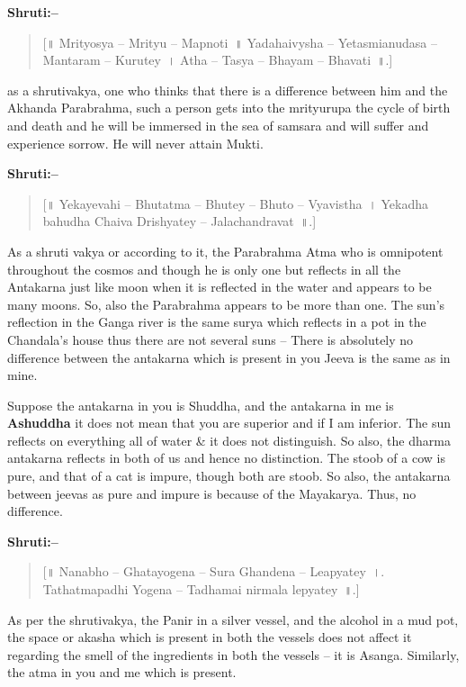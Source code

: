 \textbf{Shruti:–}

\begin{verse}
[॥ Mrityosya – Mrityu – Mapnoti~॥ Yadahaivysha – Yetasmianudasa – Mantaram – Kurutey~। Atha – Tasya – Bhayam – Bhavati~॥.]
\end{verse}

as a shrutivakya, one who thinks that there is a difference between him and the Akhanda Parabrahma, such a person gets into the mrityurupa the cycle of birth and death and he will be immersed in the sea of samsara and will suffer and experience sorrow. He will never attain Mukti.

\textbf{Shruti:–}

\begin{verse}
[॥ Yekayevahi – Bhutatma – Bhutey – Bhuto – Vyavistha~। Yekadha bahudha Chaiva Drishyatey – Jalachandravat~॥.]
\end{verse}

As a shruti vakya or according to it, the Parabrahma Atma who is omnipotent throughout the cosmos and though he is only one but reflects in all the Antakarna just like moon when it is reflected in the water and appears to be many moons. So, also the Parabrahma appears to be more than one. The sun's reflection in the Ganga river is the same surya which reflects in a pot in the Chandala's house thus there are not several suns – There is absolutely no difference between the antakarna which is present in you Jeeva is the same as in mine.

Suppose the antakarna in you is Shuddha, and the antakarna in me is \textbf{Ashuddha} it does not mean that you are superior and if I am inferior. The sun reflects on everything all of water \& it does not distinguish. So also, the dharma antakarna reflects in both of us and hence no distinction. The stoob of a cow is pure, and that of a cat is impure, though both are stoob. So also, the antakarna between jeevas as pure and impure is because of the Mayakarya. Thus, no difference.

\textbf{Shruti:–}

\begin{verse}
[॥ Nanabho – Ghatayogena – Sura Ghandena – Leapyatey~।. Tathatmapadhi Yogena – Tadhamai nirmala lepyatey~॥.]
\end{verse}

As per the shrutivakya, the Panir in a silver vessel, and the alcohol in a mud pot, the space or akasha which is present in both the vessels does not affect it regarding the smell of the ingredients in both the vessels – it is Asanga. Similarly, the atma in you and me which is present.


